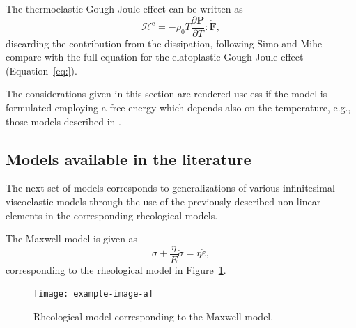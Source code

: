 The thermoelastic Gough-Joule effect can be written as
\begin{equation}
	\mathcal H^\text{e} = -\rho_0T\frac{\partial \mathbf P}{\partial T}:\dot{\mathbf F},
\end{equation}
discarding the contribution from the dissipation, following Simo and Mihe \citep{simoAssociativeCoupledThermoplasticity1992}--compare with the full equation for the elatoplastic Gough-Joule effect (Equation~\eqref{eq:}).

The considerations given in this section are rendered useless if the model is formulated employing a free energy which depends also on the temperature, e.g., those models described in  \citep{anandThermomechanicallyCoupledTheory2009, amesThermomechanicallyCoupledTheory2009}.

\subsection{Models available in the literature}



The next set of models corresponds to generalizations of various infinitesimal viscoelastic models through the use of the previously described non-linear elements in the corresponding rheological models.

The Maxwell model is given as
\begin{equation}
	\sigma + \frac{\eta}{E}\dot \sigma = \eta \dot \varepsilon,
\end{equation}
corresponding to the rheological model in Figure~\ref{fig:rheo_model_maxwell}.
\begin{figure}
	\centering
	\texttt{[image: example-image-a]}
	\caption{Rheological model corresponding to the Maxwell model.}
\label{fig:rheo_model_maxwell}
\end{figure}

